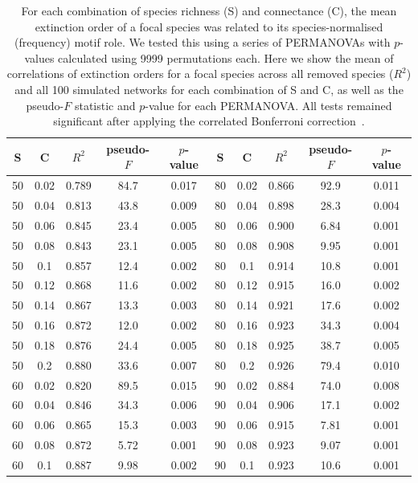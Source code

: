 \documentclass[12pt]{article}
\begin{document}
\begin{spacing}{2.0}
		\begin{table}[hb!]
			\caption{For each combination of species richness (S) and connectance (C), the mean extinction order of a focal species was related to its species-normalised (frequency) motif role. We tested this using a series of PERMANOVAs with $p$-values calculated using 9999 permutations each. Here we show the mean of correlations of extinction orders for a focal species across all removed species ($R^2$) and all 100 simulated networks for each combination of S and C, as well as the pseudo-$F$ statistic and $p$-value for each PERMANOVA. All tests remained significant after applying the correlated Bonferroni correction~\citep{Drezner2016}.}
			\label{permtable_freq}
			\begin{tabular}{c c | c | c c ||c c | c | c c |}
				S	&	C	&	$R^2$	&	pseudo-$F$	&	$p$-value	&	S	&	C &	$R^2$	&	pseudo-$F$	&	$p$-value\\ 
				\hline
                50&0.02&0.789&84.7&0.017	&	80&0.02&0.866&92.9&0.011\\
                50&0.04&0.813&43.8&0.009	&	80&0.04&0.898&28.3&0.004\\
                50&0.06&0.845&23.4&0.005	&	80&0.06&0.900&6.84&0.001\\
                50&0.08&0.843&23.1&0.005	&	80&0.08&0.908&9.95&0.001\\
                50&0.1&0.857&12.4&0.002	&	80&0.1&0.914&10.8&0.001\\
                50&0.12&0.868&11.6&0.002	&	80&0.12&0.915&16.0&0.002\\
                50&0.14&0.867&13.3&0.003	&	80&0.14&0.921&17.6&0.002\\
                50&0.16&0.872&12.0&0.002	&	80&0.16&0.923&34.3&0.004\\
                50&0.18&0.876&24.4&0.005	&	80&0.18&0.925&38.7&0.005\\
                50&0.2&0.880&33.6&0.007	&	80&0.2&0.926&79.4&0.010\\
                60&0.02&0.820&89.5&0.015	&	90&0.02&0.884&74.0&0.008\\
                60&0.04&0.846&34.3&0.006	&	90&0.04&0.906&17.1&0.002\\
                60&0.06&0.865&15.3&0.003	&	90&0.06&0.915&7.81&0.001\\
                60&0.08&0.872&5.72&0.001	&	90&0.08&0.923&9.07&0.001\\
                60&0.1&0.887&9.98&0.002	&	90&0.1&0.923&10.6&0.001\\

\end{tabular}
\end{table}
\end{spacing}
\end{document}
